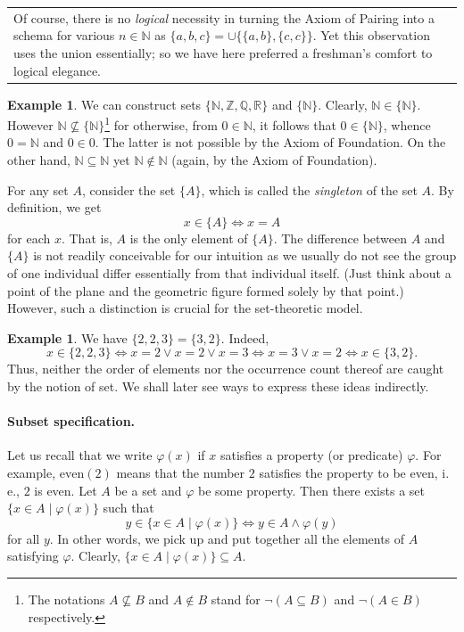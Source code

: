 \documentclass[12pt,notitlepage]{article}
\theoremstyle{plain}
\theoremstyle{definition}
\newtheorem{exm}[thm]{Example}
\theoremstyle{plain}
\newcommand{\N}{\mathbb{N}}
\newcommand{\Z}{\mathbb{Z}}
\newcommand{\Q}{\mathbb{Q}}
\newcommand{\R}{\mathbb{R}}
\newcommand{\sbs}{\subseteq}
\renewcommand{\phi}{\varphi}
\newcommand{\1}{\mathbf{1}}
\newcommand{\0}{\mathbf{0}}
\newcommand{\mcomm}[1]{
\medskip\noindent\begin{tabular}{| l}
\parbox{0.99\textwidth}{{\small
#1 }}\end{tabular}
\smallskip}
\begin{document}
\mcomm{Of course, there is no \emph{logical} necessity in turning the Axiom of Pairing into a schema for various $n \in \N$ as $\{a, b, c\} = \cup \{ \{a, b\}, \{ c, c \} \}$. Yet this observation uses the union essentially; so we have here preferred a freshman's comfort to logical elegance.}
\begin{exm}
We can construct sets $\{\N, \Z,\Q,\R\}$ and $\{ \N \}$. Clearly, $\N \in \{\N\}$. However $\N \not \sbs \{\N\}$\footnote{The notations $A \not\sbs B$ and $A \notin B$ stand for $\neg (A \sbs B)$ and $\neg (A \in B)$ respectively.} for otherwise, from $0 \in \N$, it follows that $0 \in \{\N\}$, whence $0 = \N$ and $0 \in 0$. The latter is not possible by the Axiom of Foundation. On the other hand, $\N \sbs \N$ yet $\N \notin \N$ (again, by the Axiom of Foundation).
\end{exm}

For any set $A$, consider the set $\{A\}$, which is called the \emph{singleton} of the set $A$. By definition, we get
$$x \in \{ A \} \iff x = A$$
for each $x$. That is, $A$ is the only element of $\{ A \}$. The difference between $A$ and $\{A\}$ is not  readily conceivable for our intuition as we usually do not see the group of one individual differ essentially from that individual itself. (Just think about a point of the plane and the geometric figure formed solely by that point.) However, such a distinction is crucial for the set-theoretic model.

\begin{exm}
We have $\{2,2,3\} = \{3,2\}$. Indeed, 
$$x \in \{2,2,3\} \iff x = 2 \vee x = 2 \vee x = 3 \iff x = 3 \vee x = 2 \iff x \in \{3,2\}.$$
Thus, neither the order of elements nor the occurrence count thereof are caught by the notion of set. We shall later see ways to express these ideas indirectly.
\end{exm}

\paragraph{Subset specification.}  Let us recall that we write $\phi(x)$ if $x$ satisfies a property (or predicate) $\phi$. For example, $\mbox{even}(2)$ means that the number $2$ satisfies the property to be even, i.\,e., $2$ is even. Let $A$ be a set and $\phi$ be some property. Then there exists a set $\{ x \in A \mid \phi(x) \}$ such that
$$y \in \{ x \in A \mid \phi(x) \} \iff y \in A \wedge \phi(y)$$
for all $y$. In other words, we pick up and put together all the elements of $A$ satisfying $\phi$.  Clearly, $\{ x \in A \mid \phi(x) \} \sbs A$.
\end{document}
